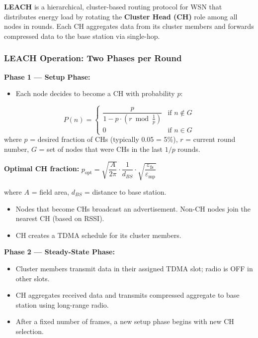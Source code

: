 \documentclass[12pt,a4paper]{article}
\begin{document}
\begin{tcolorbox}[defbox, title={\textbf{LEACH --- Definition}}]
\textbf{LEACH} is a hierarchical, cluster-based routing protocol for WSN that distributes energy load by rotating the \textbf{Cluster Head (CH)} role among all nodes in rounds. Each CH aggregates data from its cluster members and forwards compressed data to the base station via single-hop.
\end{tcolorbox}

\subsubsection*{LEACH Operation: Two Phases per Round}

\textbf{Phase 1 --- Setup Phase:}
\begin{itemize}[leftmargin=*, itemsep=2pt]
  \item Each node decides to become a CH with probability $p$:
\end{itemize}

\begin{tcolorbox}[formulabox, title={\textbf{LEACH --- Cluster Head Probability}}]
\[
P(n) = \begin{cases}
\dfrac{p}{1 - p \cdot (r \bmod \frac{1}{p})} & \text{if } n \notin G \\
0 & \text{if } n \in G
\end{cases}
\]
where $p$ = desired fraction of CHs (typically 0.05 = 5\%), $r$ = current round number, $G$ = set of nodes that were CHs in the last $1/p$ rounds.

\textbf{Optimal CH fraction:} $p_{\text{opt}} = \sqrt{\dfrac{A}{2\pi}} \cdot \dfrac{1}{d_{BS}} \cdot \sqrt{\dfrac{\varepsilon_{\text{fs}}}{\varepsilon_{\text{mp}}}}$

where $A$ = field area, $d_{BS}$ = distance to base station.
\end{tcolorbox}

\begin{itemize}[leftmargin=*, itemsep=2pt]
  \item Nodes that become CHs broadcast an advertisement. Non-CH nodes join the nearest CH (based on RSSI).
  \item CH creates a TDMA schedule for its cluster members.
\end{itemize}

\textbf{Phase 2 --- Steady-State Phase:}
\begin{itemize}[leftmargin=*, itemsep=2pt]
  \item Cluster members transmit data in their assigned TDMA slot; radio is OFF in other slots.
  \item CH aggregates received data and transmits compressed aggregate to base station using long-range radio.
  \item After a fixed number of frames, a new setup phase begins with new CH selection.
\end{itemize}
\end{document}
